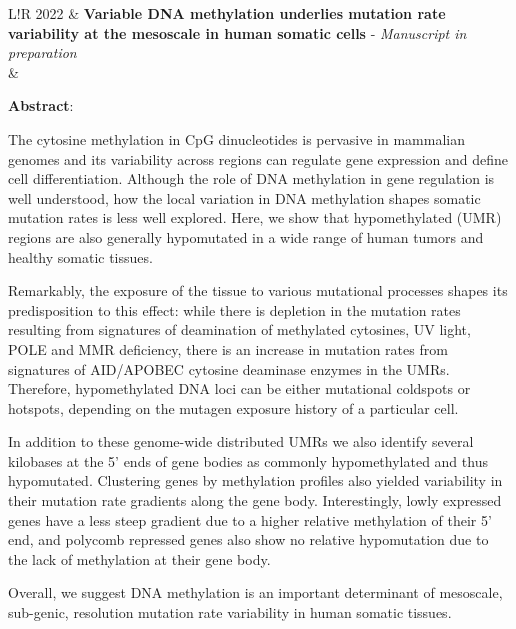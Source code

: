 \documentclass[10pt,a4paper]{article} %
\newcommand\VRule{\color{lightgray}\vrule width 0.5pt}
\begin{document}
\begin{tabular}{L!{\VRule}R}
2022 & \textbf{Variable DNA methylation underlies mutation rate variability at the mesoscale in human somatic cells} -  {\em \color{black!70} Manuscript in preparation}   \\
& 

\bigskip

\textbf{Abstract}:



The cytosine methylation in CpG dinucleotides is pervasive in mammalian genomes and its variability across regions can regulate gene expression and define cell differentiation. Although the role of DNA methylation in gene regulation is well understood, how the local variation in DNA methylation shapes somatic mutation rates is less well explored. Here, we show that hypomethylated (UMR) regions are also generally hypomutated in a wide range of human tumors and healthy somatic tissues.

\medskip

Remarkably, the exposure of the tissue to various mutational processes shapes its predisposition to this effect: while there is depletion in the mutation rates resulting from signatures of deamination of methylated cytosines, UV light, POLE and MMR deficiency, there is an increase in mutation rates from signatures of AID/APOBEC cytosine deaminase enzymes in the UMRs. Therefore, hypomethylated DNA loci can be either mutational coldspots or hotspots, depending on the mutagen exposure history of a particular cell.

\medskip

In addition to these genome-wide distributed UMRs we also identify several kilobases at the 5’ ends of gene bodies as commonly hypomethylated and thus hypomutated. Clustering genes by methylation profiles also yielded variability in their mutation rate gradients along the gene body. Interestingly, lowly expressed genes have a less steep gradient due to a higher relative methylation of their 5’ end, and polycomb repressed genes also show no relative hypomutation due to the lack of methylation at their gene body.


\medskip


Overall, we suggest DNA methylation is an important determinant of mesoscale, sub-genic, resolution mutation rate variability in human somatic tissues.


\end{tabular}

\fi
\end{document}
